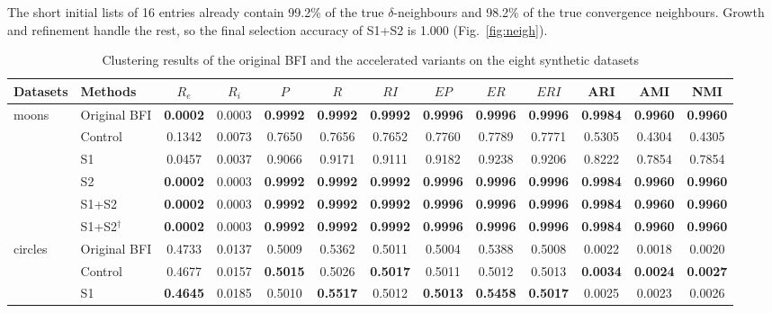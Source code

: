 \documentclass[journal]{IEEEtran}
\begin{document}
The short initial lists of 16 entries already contain 99.2\% of the true $\delta$-neighbours and 98.2\% of the true convergence neighbours. Growth and refinement handle the rest, so the final selection accuracy of S1+S2 is 1.000 (Fig.~\ref{fig:neigh}).

\begin{table}[!t]
\centering
\caption{Clustering results of the original BFI and the accelerated variants on the eight synthetic datasets}
\label{tab:synthetic}
\scriptsize
\setlength{\tabcolsep}{4.2pt}
\begin{tabular}{llccccccccccc}
\toprule
Datasets & Methods & $R_e$ & $R_i$ & $P$ & $R$ & $RI$ & $EP$ & $ER$ & $ERI$ & ARI & AMI & NMI \\
\midrule
\multirow{6}{*}{moons} & Original BFI & \textbf{0.0002} & 0.0003 & \textbf{0.9992} & \textbf{0.9992} & \textbf{0.9992} & \textbf{0.9996} & \textbf{0.9996} & \textbf{0.9996} & \textbf{0.9984} & \textbf{0.9960} & \textbf{0.9960} \\
 & Control & 0.1342 & 0.0073 & 0.7650 & 0.7656 & 0.7652 & 0.7760 & 0.7789 & 0.7771 & 0.5305 & 0.4304 & 0.4305 \\
 & S1 & 0.0457 & 0.0037 & 0.9066 & 0.9171 & 0.9111 & 0.9182 & 0.9238 & 0.9206 & 0.8222 & 0.7854 & 0.7854 \\
 & S2 & \textbf{0.0002} & 0.0003 & \textbf{0.9992} & \textbf{0.9992} & \textbf{0.9992} & \textbf{0.9996} & \textbf{0.9996} & \textbf{0.9996} & \textbf{0.9984} & \textbf{0.9960} & \textbf{0.9960} \\
 & S1+S2 & \textbf{0.0002} & 0.0003 & \textbf{0.9992} & \textbf{0.9992} & \textbf{0.9992} & \textbf{0.9996} & \textbf{0.9996} & \textbf{0.9996} & \textbf{0.9984} & \textbf{0.9960} & \textbf{0.9960} \\
 & S1+S2$^{\dagger}$ & \textbf{0.0002} & 0.0003 & \textbf{0.9992} & \textbf{0.9992} & \textbf{0.9992} & \textbf{0.9996} & \textbf{0.9996} & \textbf{0.9996} & \textbf{0.9984} & \textbf{0.9960} & \textbf{0.9960} \\
\midrule
\multirow{6}{*}{circles} & Original BFI & 0.4733 & 0.0137 & 0.5009 & 0.5362 & 0.5011 & 0.5004 & 0.5388 & 0.5008 & 0.0022 & 0.0018 & 0.0020 \\
 & Control & 0.4677 & 0.0157 & \textbf{0.5015} & 0.5026 & \textbf{0.5017} & 0.5011 & 0.5012 & 0.5013 & \textbf{0.0034} & \textbf{0.0024} & \textbf{0.0027} \\
 & S1 & \textbf{0.4645} & 0.0185 & 0.5010 & \textbf{0.5517} & 0.5012 & \textbf{0.5013} & \textbf{0.5458} & \textbf{0.5017} & 0.0025 & 0.0023 & 0.0026 \\

\end{tabular}
\end{table}
\end{document}
